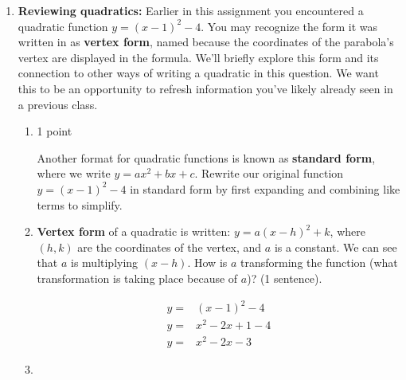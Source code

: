 \documentclass{article}
\begin{document}
\begin{enumerate}
\begin{enumerate}
    \begin{solution}
      Titmus's speed at any moment is the absolute value of her velocity:
      \begin{center}
      \end{center}
    \end{solution}

  \end{enumerate}

\item 

\begin{problem}
    {\bf Reviewing quadratics:} Earlier in this assignment you encountered a quadratic function $y = (x-1)^2 - 4$. You may recognize the form it was written in as {\bf vertex form}, named because the coordinates of the parabola's vertex are displayed in the formula.  We'll briefly explore this form and its connection to other ways of writing a quadratic in this question. We want this to be an opportunity to refresh information you've likely already seen in a previous class.
\end{problem}
\begin{enumerate}

    \item 
     \begin{grading}
        1 point
    \end{grading}
    Another format for quadratic functions is known as {\bf standard form}, where we write $y=ax^2+bx+c$. Rewrite our original function $y = (x-1)^2 - 4$ in standard form by first expanding and combining like terms to simplify. 
    
   
    \vfill 

    \item 
    \begin{problem}  {\bf Vertex form} of a quadratic is written: $y=a(x-h)^2+k$, where $(h, k)$ are the coordinates of the vertex, and $a$ is a constant. We can see that $a$ is multiplying $(x-h)$.  How is $a$ transforming the function (what transformation is taking place because of $a$)? (1 sentence).
    \end{problem}
    \begin{problemonly} \vfill 
    \end{problemonly}
    \begin{solution}
        \begin{align*}
            y=&(x-1)^2-4\\
            y=&x^2-2x+1-4\\
            y=&x^2-2x-3
        \end{align*}
    \end{solution}
    \item 
    

\end{enumerate}
\end{enumerate}
\end{document}
